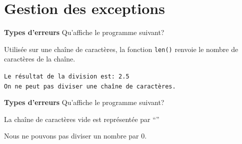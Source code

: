 \section{Gestion des exceptions}

\begin{Exercice}[5 minutes] [Python] \textbf{Types d'erreurs} Qu'affiche le programme suivant?\\
    
     \begin{conseil}
        Utilisée sur une chaîne de caractères, la fonction \lstinline{len()} renvoie le nombre de caractères de la chaîne. 
    \end{conseil}
     \begin{solution}
        \lstinline{Le résultat de la division est: 2.5}\\
        \lstinline{On ne peut pas diviser une chaîne de caractères.}
     \end{solution}   
 \end{Exercice}

\begin{Exercice}[5 minutes] [Python] \textbf{Types d'erreurs} Qu'affiche le programme suivant?\\
    
    
     \begin{conseil}
         La chaîne de caractères vide est représentée par ``'' 
    \end{conseil}
     \begin{solution}
        Nous ne pouvons pas diviser un nombre par 0.
     \end{solution}   
 \end{Exercice}

